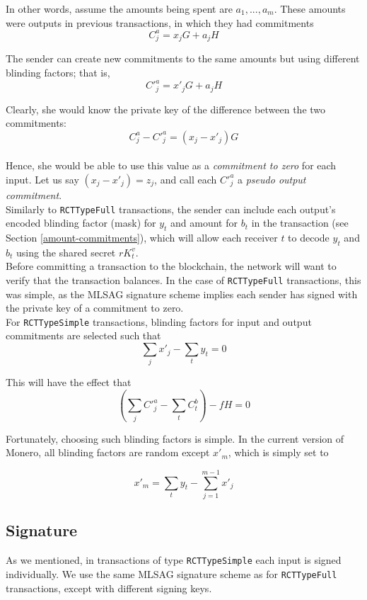 In other words, assume the amounts being spent are \(a_1, ..., a_m\). These amounts were outputs in previous transactions, in which they had commitments\\
\[C^a_{j} = x_j G + a_j H\]


The sender can create new commitments to the same amounts but using different blinding factors; that is,
\[C'^a_{j} = x'_j G + a_j H\]

Clearly, she would know the private key of the difference between the two commitments: \\
\[ C^a_{j} - C'^a_{j} = (x_j - x'_j) G \] \\
Hence, she would be able to use this value as a {\em commitment to zero} for each input. Let us say $(x_j - x'_j) = z_j$, and call each $C'^a_j$ a {\em pseudo output commitment}.
\\

Similarly to {\tt RCTTypeFull} transactions, the sender can include each output’s encoded blinding factor (mask) for $y_t$ and amount for $b_t$ in the transaction (see Section \ref{amount-commitments}), which will allow each receiver $t$ to decode $y_t$ and $b_t$ using the shared secret $r K_t^v$.
\\

Before committing a transaction to the blockchain, the network will want to verify that the transaction balances. In the case of {\tt RCTTypeFull} transactions, this was simple, as the MLSAG signature scheme implies each sender has signed with the private key of a commitment to zero.
\\

For {\tt RCTTypeSimple} transactions, blinding factors for input and output commitments are selected such that
\[\sum_j x'_j  - \sum_t y_t = 0  \]

This will have the effect that\\
\[ (\sum_j C'^a_{j} - \sum_t C^b_{t}) - f H = 0\]


Fortunately, choosing such blinding factors is simple. In the current version of Monero, all blinding factors are random except $x'_m$, which is simply set to

\[x'_m = \sum_t y_t - \sum_{j=1}^{m-1} x'_j  \]




\subsection{Signature}

As we mentioned, in transactions of type {\tt RCTTypeSimple} each input is signed individually. We use the same MLSAG signature scheme as for {\tt RCTTypeFull} transactions, except with different signing keys.
\\

